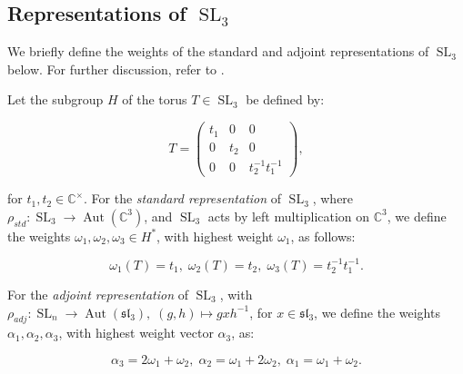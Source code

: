 \documentclass{amsart}
\newcommand{\C}{\mathbb{C}}
\newcommand{\fr}{\mathfrak}
\newcommand{\Proj}{\mathbb{P}}
\DeclareMathOperator{\Aut}{Aut}
\DeclareMathOperator{\End}{End}
\DeclareMathOperator{\SL}{SL}
\DeclareMathOperator{\PGL}{PGL}
\theoremstyle{definition}
\theoremstyle{remark}
\numberwithin{equation}{section}
\begin{document}
\subsection{Representations of $\SL_3$} We briefly define the weights of the standard and adjoint representations of $\SL_3$ below. For further discussion, refer to \cite{FH}. 

Let the subgroup $H$ of the torus $T \in \SL_3$ be defined by:

\[T = \begin{pmatrix}
t_1&0&0\\
0&t_2&0\\
0&0&t_2^{-1}t_1^{-1}
\end{pmatrix},\]

for $t_1, t_2 \in \C^{\times}$. For the \textit{standard representation} of $\SL_3$, where $\rho_{std}: \SL_3 \to \Aut(\C^3)$, and $\SL_3$ acts by left multiplication on $\C^3$, we define the weights $\omega_1, \omega_2, \omega_3 \in H^*$, with highest weight $\omega_1$, as follows:

\[\omega_1(T) = t_1, \;
\omega_2(T) = t_2, \;
\omega_3(T) = t_2^{-1}t_1^{-1}.\]

For the \textit{adjoint representation} of $\SL_3$, with $\rho_{adj}: \SL_n \to \Aut(\fr{sl_3}), \; (g, h) \mapsto gxh^{-1}$, for $x \in \fr{sl_3}$,  we define the weights $\alpha_1, \alpha_2, \alpha_3$, with highest weight vector $\alpha_3$, as:

\[\alpha_3 = 2\omega_1 + \omega_2, \; \alpha_2 = \omega_1 + 2\omega_2, \; \alpha_1 = \omega_1 + \omega_2. \]




\end{document}
